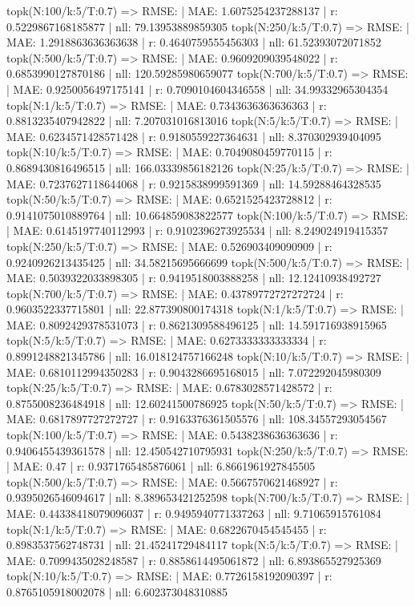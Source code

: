 topk(N:100/k:5/T:0.7) => RMSE: | MAE: 1.6075254237288137 | r: 0.5229867168185877 | nll: 79.13953889859305
topk(N:250/k:5/T:0.7) => RMSE: | MAE: 1.2918863636363638 | r: 0.4640759555456303 | nll: 61.52393072071852
topk(N:500/k:5/T:0.7) => RMSE: | MAE: 0.9609209039548022 | r: 0.6853990127870186 | nll: 120.59285980659077
topk(N:700/k:5/T:0.7) => RMSE: | MAE: 0.9250056497175141 | r: 0.7090104604346558 | nll: 34.99332965304354
topk(N:1/k:5/T:0.7) => RMSE: | MAE: 0.7343636363636363 | r: 0.8813235407942822 | nll: 7.207031016813016
topk(N:5/k:5/T:0.7) => RMSE: | MAE: 0.6234571428571428 | r: 0.9180559227364631 | nll: 8.370302939404095
topk(N:10/k:5/T:0.7) => RMSE: | MAE: 0.7049080459770115 | r: 0.8689430816496515 | nll: 166.03339856182126
topk(N:25/k:5/T:0.7) => RMSE: | MAE: 0.7237627118644068 | r: 0.9215838999591369 | nll: 14.59288464328535
topk(N:50/k:5/T:0.7) => RMSE: | MAE: 0.6521525423728812 | r: 0.9141075010889764 | nll: 10.664859083822577
topk(N:100/k:5/T:0.7) => RMSE: | MAE: 0.6145197740112993 | r: 0.9102396273925534 | nll: 8.249024919415357
topk(N:250/k:5/T:0.7) => RMSE: | MAE: 0.526903409090909 | r: 0.9240926213435425 | nll: 34.58215695666699
topk(N:500/k:5/T:0.7) => RMSE: | MAE: 0.5039322033898305 | r: 0.9419518003888258 | nll: 12.12410938492727
topk(N:700/k:5/T:0.7) => RMSE: | MAE: 0.43789772727272724 | r: 0.9603522337715801 | nll: 22.877390800174318
topk(N:1/k:5/T:0.7) => RMSE: | MAE: 0.8092429378531073 | r: 0.8621309588496125 | nll: 14.591716938915965
topk(N:5/k:5/T:0.7) => RMSE: | MAE: 0.6273333333333334 | r: 0.8991248821345786 | nll: 16.018124757166248
topk(N:10/k:5/T:0.7) => RMSE: | MAE: 0.6810112994350283 | r: 0.9043286695168015 | nll: 7.072292045980309
topk(N:25/k:5/T:0.7) => RMSE: | MAE: 0.6783028571428572 | r: 0.8755008236484918 | nll: 12.60241500786925
topk(N:50/k:5/T:0.7) => RMSE: | MAE: 0.6817897727272727 | r: 0.9163376361505576 | nll: 108.34557293054567
topk(N:100/k:5/T:0.7) => RMSE: | MAE: 0.5438238636363636 | r: 0.9406455439361578 | nll: 12.450542710795931
topk(N:250/k:5/T:0.7) => RMSE: | MAE: 0.47 | r: 0.9371765485876061 | nll: 6.8661961927845505
topk(N:500/k:5/T:0.7) => RMSE: | MAE: 0.5667570621468927 | r: 0.9395026546094617 | nll: 8.389653421252598
topk(N:700/k:5/T:0.7) => RMSE: | MAE: 0.44338418079096037 | r: 0.9495940771337263 | nll: 9.71065915761084
topk(N:1/k:5/T:0.7) => RMSE: | MAE: 0.6822670454545455 | r: 0.8983537562748731 | nll: 21.45241729484117
topk(N:5/k:5/T:0.7) => RMSE: | MAE: 0.7099435028248587 | r: 0.8858614495061872 | nll: 6.893865527925369
topk(N:10/k:5/T:0.7) => RMSE: | MAE: 0.7726158192090397 | r: 0.8765105918002078 | nll: 6.602373048310885
